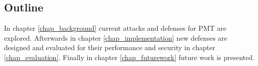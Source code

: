 \subsection{Outline}
In chapter \ref{chap_background} current attacks and defenses for PMT are explored. Afterwards in chapter \ref{chap_implementation} new defenses are designed and evaluated for their performance and security in chapter \ref{chap_evaluation}. Finally in chapter \ref{chap_futurework} future work is presented.